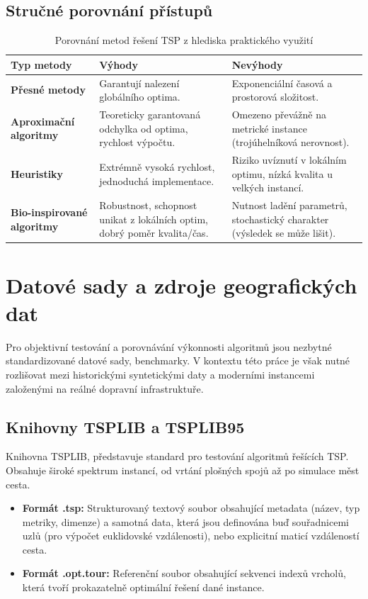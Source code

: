 \subsection{Stručné porovnání přístupů}
\begin{table}[h]
\centering
\renewcommand{\arraystretch}{1.3} %
\begin{tabular}{|p{3cm}|p{4.5cm}|p{4.5cm}|}
\hline
\textbf{Typ metody} & \textbf{Výhody} & \textbf{Nevýhody} \\ \hline
\textbf{Přesné metody} & Garantují nalezení globálního optima. & Exponenciální časová a prostorová složitost. \\ \hline
\textbf{Aproximační algoritmy} & Teoreticky garantovaná odchylka od optima, rychlost výpočtu. & Omezeno převážně na metrické instance (trojúhelníková nerovnost). \\ \hline
\textbf{Heuristiky} & Extrémně vysoká rychlost, jednoduchá implementace. & Riziko uvíznutí v lokálním optimu, nízká kvalita u velkých instancí. \\ \hline
\textbf{Bio-inspirované algoritmy} & Robustnost, schopnost unikat z lokálních optim, dobrý poměr kvalita/čas. & Nutnost ladění parametrů, stochastický charakter (výsledek se může lišit). \\ \hline
\end{tabular}
\caption{Porovnání metod řešení TSP z hlediska praktického využití}
\label{tab:srovnani_metod}
\end{table}

\section{Datové sady a zdroje geografických dat}
Pro objektivní testování a porovnávání výkonnosti algoritmů jsou nezbytné standardizované datové sady, benchmarky. V kontextu této práce je však nutné rozlišovat mezi historickými syntetickými daty a moderními instancemi založenými na reálné dopravní infrastruktuře.

\subsection{Knihovny TSPLIB a TSPLIB95}
Knihovna TSPLIB, představuje standard pro testování algoritmů řešících TSP. Obsahuje široké spektrum instancí, od vrtání plošných spojů až po simulace měst cesta.
\begin{itemize}
    \item \textbf{Formát .tsp:} Strukturovaný textový soubor obsahující metadata (název, typ metriky, dimenze) a samotná data, která jsou definována buď souřadnicemi uzlů (pro výpočet euklidovské vzdálenosti), nebo explicitní maticí vzdáleností cesta.
    \item \textbf{Formát .opt.tour:} Referenční soubor obsahující sekvenci indexů vrcholů, která tvoří prokazatelně optimální řešení dané instance.
\end{itemize}

